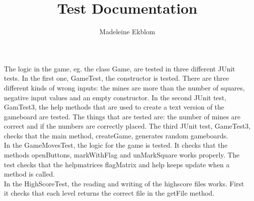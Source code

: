 \documentclass[12pt,twoside,a4paper]{article}
\title{Test Documentation}
\author{Madeleine Ekblom}
\begin{document}
\maketitle

\newpage

The logic in the game, eg. the class Game, are tested in three different JUnit tests. In the first one, GameTest, the constructor is tested. There are three different kinds of wrong inputs: the mines are more than the number of squares, negative input values and an empty constructor.
In the second JUnit test, GamTest3, the help methods that are used to create a text version of the gameboard are tested. The things that are tested are: the number of mines are correct and if the numbers are correctly placed.
The third JUnit test, GameTest3, checks that the main method, createGame, generates random gameboards. \\

In the GameMovesTest, the logic for the game is tested. It checks that the methods openButtons, markWithFlag and unMarkSquare works properly. The test checks that the helpmatrices flagMatrix and help keeps update when a method is called. \\

In the HighScoreTest, the reading and writing of the highscore files works. First it checks that each level returns the correct file in the getFile method.
\end{document}
